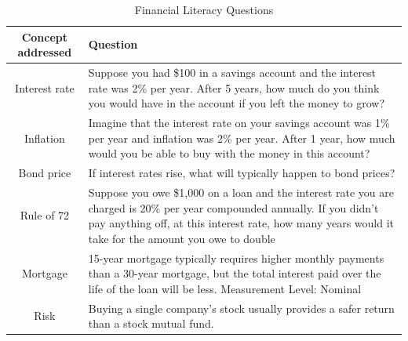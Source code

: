 \documentclass[12pt]{article}
\renewcommand{\arraystretch}{0.7}
\theoremstyle{plain}
\begin{document}
\begin{table}[H]
\centering
\caption{Financial Literacy Questions}
\renewcommand{\arraystretch}{1}
\begin{tabular} {|c|p{13.3cm}|}

 \hline
\textbf{Concept addressed} & \textbf{Question}\\ [0.5 ex] 
 \hline \hline


Interest rate & Suppose you had \$100 in a savings account and the interest rate was 2\%
per year. After 5 years, how much do you think you would have in the
account if you left the money to grow?\\
 \hline
Inflation &	Imagine that the interest rate on your savings account was 1\% per year and inflation was 2\% per year. After 1 year, how much would you be able
to buy with the money in this account?\\
\hline
Bond price &	If interest rates rise, what will typically happen to bond prices?\\
\hline
Rule of 72 &	Suppose you owe \$1,000 on a loan and the interest rate you are charged is 20\% per year compounded annually. If you didn’t pay anything off, at this interest rate, how many years would it take for the amount you owe to double\\
\hline
Mortgage &	15-year mortgage typically requires higher monthly payments than a
30-year mortgage, but the total interest paid over the life of the loan
will be less.
Measurement Level: Nominal\\
\hline
Risk &	Buying a single company's stock usually provides a safer return than a
stock mutual fund.\\
\hline
\end{tabular}
\label{tab:literacy}
\end{table}
\end{document}
